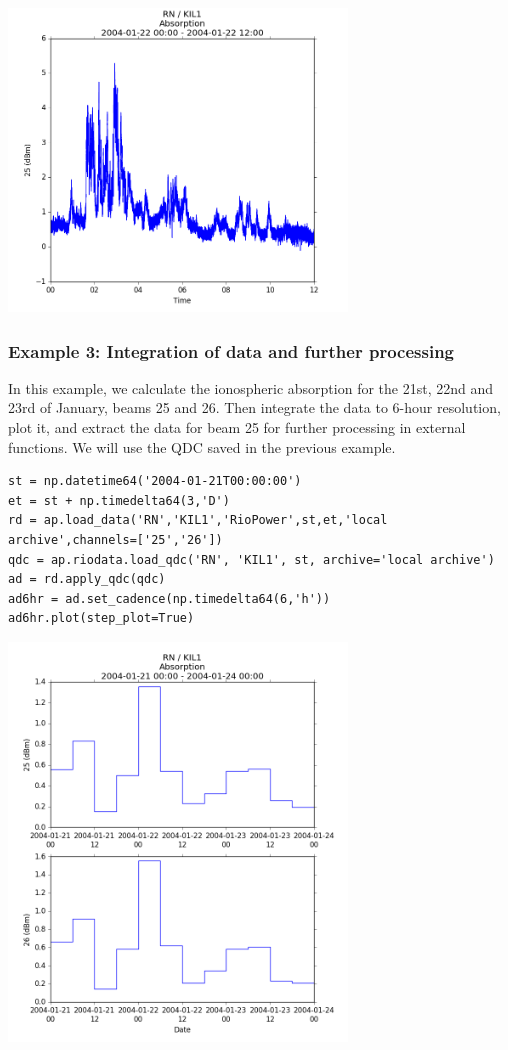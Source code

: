 \documentclass{article}
\begin{document}
\includegraphics[width=9cm]{images/figure_5.png}

\subsubsection{Example 3: Integration of data and further processing}

In this example, we calculate the ionospheric absorption for the 21st, 22nd and 23rd of January, beams 25 and 26. Then integrate the data to 6-hour resolution, plot it, and extract the data for beam 25 for further processing in external functions. We will use the QDC saved in the previous example.

\begin{lstlisting}[style=pythonstyle]
st = np.datetime64('2004-01-21T00:00:00')
et = st + np.timedelta64(3,'D')
rd = ap.load_data('RN','KIL1','RioPower',st,et,'local archive',channels=['25','26'])
qdc = ap.riodata.load_qdc('RN', 'KIL1', st, archive='local archive')
ad = rd.apply_qdc(qdc)
ad6hr = ad.set_cadence(np.timedelta64(6,'h'))
ad6hr.plot(step_plot=True)
\end{lstlisting}

\includegraphics[width=9cm]{images/figure_6.png}
\end{document}
